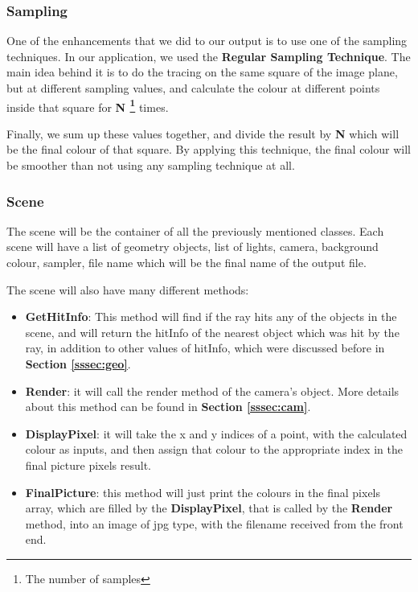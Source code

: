 \documentclass[a4paper]{report}
\begin{document}
	\subsubsection{Sampling}
	One of the enhancements that we did to our output is to use one of the sampling techniques. In our application, we used the \textbf{Regular Sampling Technique}. The main idea behind it is to do the tracing on the same square of the image plane, but at different sampling values, and calculate the colour at different points inside that square for \textbf{N \footnote{The number of samples}} times.\\
	\par Finally, we sum up these values together, and divide the result by \textbf{N} which will be the final colour of that square. By applying this technique, the final colour will be smoother than not using any sampling technique at all.
	\subsubsection{Scene}
	The scene will be the container of all the previously mentioned classes. Each scene will have a list of geometry objects, list of lights, camera, background colour, sampler, file name which will be the final name of the output file.\\
	\par The scene will also have many different methods:
	\begin{itemize}
		\item \textbf{GetHitInfo}: This method will find if the ray hits any of the objects in the scene, and will return the hitInfo of the nearest object which was hit by the ray, in addition to other values of hitInfo, which were discussed before in \textbf{Section \ref{sssec:geo}}.
		\item \textbf{Render}: it will call the render method of the camera's object. More details about this method can be found in \textbf{Section \ref{sssec:cam}}.
		\item \textbf{DisplayPixel}: it will take the x and y indices of a point, with the calculated colour as inputs, and then assign that colour to the appropriate index in the final picture pixels result.
		\item \textbf{FinalPicture}: this method will just print the colours in the final pixels array, which are filled by the \textbf{DisplayPixel}, that is called by the \textbf{Render} method, into an image of jpg type, with the filename received from the front end.
	\end{itemize}
\end{document}
